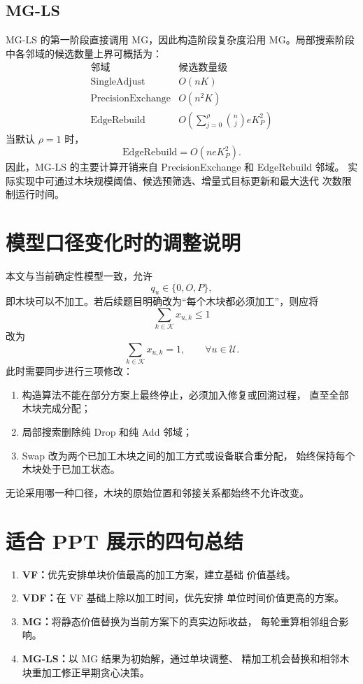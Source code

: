 \documentclass[UTF8,12pt,a4paper]{ctexart}
\newcommand{\Alg}[1]{\textsc{#1}}
\newcommand{\U}{\mathcal{U}}
\newcommand{\K}{\mathcal{K}}
\begin{document}
\subsection{\Alg{MG-LS}}

\Alg{MG-LS} 的第一阶段直接调用 \Alg{MG}，因此构造阶段复杂度沿用
\Alg{MG}。局部搜索阶段中各邻域的候选数量上界可概括为：
\[
\begin{array}{c|c}
\text{邻域} & \text{候选数量级}\\
\hline
\mathrm{SingleAdjust} & O(nK)\\
\mathrm{PrecisionExchange} & O(n^2K)\\
\mathrm{EdgeRebuild} &
O\!\left(
\displaystyle
\sum_{j=0}^{\rho}\binom{n}{j}eK_P^2
\right)
\end{array}
\]
当默认 \(\rho=1\) 时，
\[
\mathrm{EdgeRebuild}
=
O(neK_P^2).
\]
因此，\Alg{MG-LS} 的主要计算开销来自 PrecisionExchange 和 EdgeRebuild 邻域。
实际实现中可通过木块规模阈值、候选预筛选、增量式目标更新和最大迭代
次数限制运行时间。

\section{模型口径变化时的调整说明}

本文与当前确定性模型一致，允许
\[
q_u\in\{0,O,P\},
\]
即木块可以不加工。若后续题目明确改为“每个木块都必须加工”，则应将
\[
\sum_{k\in\K}x_{u,k}\leq1
\]
改为
\[
\sum_{k\in\K}x_{u,k}=1,
\qquad \forall u\in\U.
\]
此时需要同步进行三项修改：
\begin{enumerate}
  \item 构造算法不能在部分方案上最终停止，必须加入修复或回溯过程，
        直至全部木块完成分配；
  \item 局部搜索删除纯 Drop 和纯 Add 邻域；
  \item Swap 改为两个已加工木块之间的加工方式或设备联合重分配，
        始终保持每个木块处于已加工状态。
\end{enumerate}
无论采用哪一种口径，木块的原始位置和邻接关系都始终不允许改变。

\section{适合 PPT 展示的四句总结}

\begin{enumerate}
  \item \textbf{\Alg{VF}：}优先安排单块价值最高的加工方案，建立基础
        价值基线。
  \item \textbf{\Alg{VDF}：}在 \Alg{VF} 基础上除以加工时间，优先安排
        单位时间价值更高的方案。
  \item \textbf{\Alg{MG}：}将静态价值替换为当前方案下的真实边际收益，
        每轮重算相邻组合影响。
  \item \textbf{\Alg{MG-LS}：}以 \Alg{MG} 结果为初始解，通过单块调整、
        精加工机会替换和相邻木块重加工修正早期贪心决策。
\end{enumerate}
\end{document}
